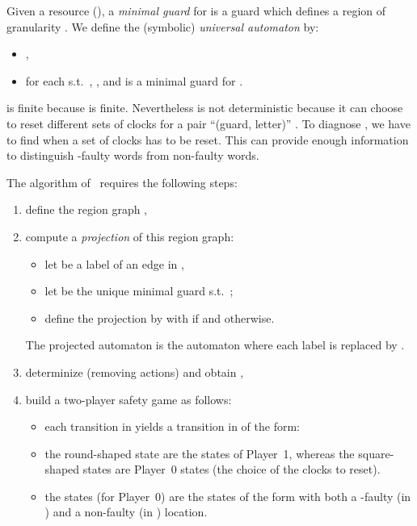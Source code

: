 \documentclass[letterpaper,10pt,conference]{ieeeconf}  \IEEEoverridecommandlockouts                              \overrideIEEEmargins
\def\st{{s.t.}~}
\begin{document}
Given a resource  (), a
\emph{minimal guard} for  is a guard which defines a region of
granularity . We define the (symbolic) \emph{universal automaton}
 by:
\begin{itemize}
\item ,
\item  for each  \st ,
  , and  is a minimal guard for .
\end{itemize}

 is finite because  is finite.  Nevertheless  is
not deterministic because it can choose to reset different sets of
clocks  for a pair ``(guard, letter)'' .  To diagnose ,
we have to find when a set of clocks has to be reset. This can provide
enough information to distinguish -faulty words from
non-faulty words.

The algorithm of~\cite{Bouyerfossacs05} requires the following steps:
\begin{enumerate}
\item define the region graph ,
\item compute a \emph{projection} of this region graph:
  \begin{itemize}
  \item let  be a label of an edge in ,
  \item let  be the unique minimal guard \st ;
  \item define the projection  by  with  if  and
     otherwise.
  \end{itemize}
  The projected automaton  is
  the automaton  where each label
   is repla\-ced by .
\item determinize  (removing
   actions) and obtain ,
\item build a two-player safety game  as follows:
  \begin{itemize}
  \item each transition 
in  yi\-elds a transition in  of
    the form:

\begin{center}
    \end{center}

  \item the round-shaped state are the states of Player~1, whereas the
    square-shaped states are Player~0 states (the choice of the clocks
    to reset).
  \item the  states (for Player~0) are the states of the
    form  with both
    a -faulty (in ) and a non-faulty (in ) location.
  \end{itemize}
\end{enumerate}
\end{document}
